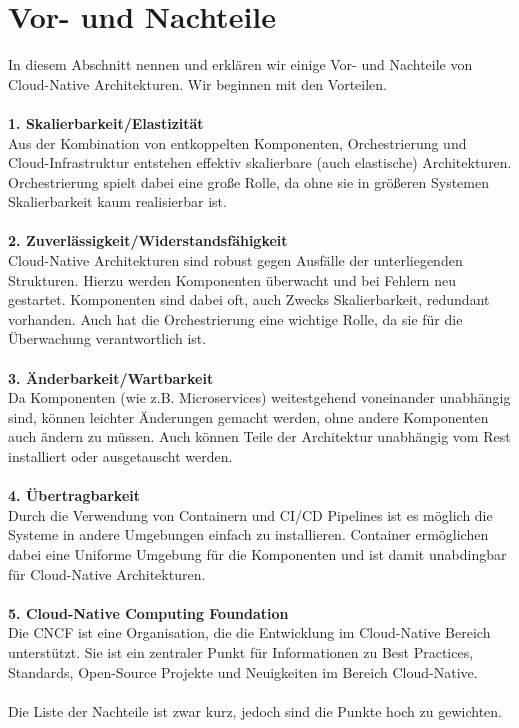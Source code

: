 \section{Vor- und Nachteile}
In diesem Abschnitt nennen und erklären wir einige Vor- und Nachteile von Cloud-Native Architekturen. Wir beginnen mit den Vorteilen.\\
\\
\textbf{1. Skalierbarkeit/Elastizität}\\
Aus der Kombination von entkoppelten Komponenten, Orchestrierung und Cloud-Infrastruktur entstehen effektiv skalierbare (auch elastische) Architekturen. Orchestrierung spielt dabei eine große Rolle, da ohne sie in größeren Systemen Skalierbarkeit kaum realisierbar ist.\\
\\
\textbf{2. Zuverlässigkeit/Widerstandsfähigkeit}\\
Cloud-Native Architekturen sind robust gegen Ausfälle der unterliegenden Strukturen. Hierzu werden Komponenten überwacht und bei Fehlern neu gestartet. Komponenten sind dabei oft, auch Zwecks Skalierbarkeit, redundant vorhanden. Auch hat die Orchestrierung eine wichtige Rolle, da sie für die Überwachung verantwortlich ist.\\
\\
\textbf{3. Änderbarkeit/Wartbarkeit}\\
Da Komponenten (wie z.B. Microservices) weitestgehend voneinander unabhängig sind, können leichter Änderungen gemacht werden, ohne andere Komponenten auch ändern zu müssen. Auch können Teile der Architektur unabhängig vom Rest installiert oder ausgetauscht werden.\\
\\
\textbf{4. Übertragbarkeit}\\
Durch die Verwendung von Containern und CI/CD Pipelines ist es möglich die Systeme in andere Umgebungen einfach zu installieren. Container ermöglichen dabei eine Uniforme Umgebung für die Komponenten und ist damit unabdingbar für Cloud-Native Architekturen. \\
\\
\textbf{5. Cloud-Native Computing Foundation}\\
Die CNCF ist eine Organisation, die die Entwicklung im Cloud-Native Bereich unterstützt. Sie ist ein zentraler Punkt für Informationen zu Best Practices, Standards, Open-Source Projekte und Neuigkeiten im Bereich Cloud-Native.\\
\\
Die Liste der Nachteile ist zwar kurz, jedoch sind die Punkte hoch zu gewichten.\\
